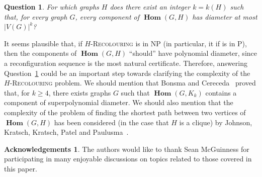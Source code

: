 \documentclass[11 pt]{amsart}
\newtheorem{ques}[equation]{Question}
\theoremstyle{definition}
\newtheorem*{ack}{Acknowledgements}
\theoremstyle{case}
\numberwithin{equation}{section}
\newcommand\Hrec[1]{\textsc{$#1$-Recolouring}}
\newcommand{\bHom}{\operatorname{\mathbf{Hom}}}
\begin{document}
\begin{ques}
\label{diamQ}
For which graphs $H$ does there exist an integer $k=k(H)$ such that, for every graph $G$, every component of $\bHom(G,H)$ has diameter at most $|V(G)|^k$?
\end{ques}

It seems plausible that, if \Hrec{H} is in NP (in particular, it if is in P), then the components of $\bHom(G,H)$ ``should'' have polynomial diameter, since a reconfiguration sequence is the most natural certificate. Therefore, answering Question~\ref{diamQ} could be an important step towards clarifying the complexity of the \Hrec{H} problem. We should mention that Bonsma and Cereceda~\cite{Bonsma} proved that, for $k\geq4$, there exists graphs $G$ such that $\bHom(G,K_k)$ contains a component of superpolynomial diameter. We should also mention that the complexity of the problem of finding the shortest path between two vertices of $\bHom(G,H)$ has been considered (in the case that $H$ is a clique) by Johnson, Kratsch, Kratsch, Patel and Paulusma~\cite{shortest}. 


\begin{ack}
The authors would like to thank Sean McGuinness for participating in many enjoyable discussions on topics related to those covered in this paper. 
\end{ack}



  
\end{document}
